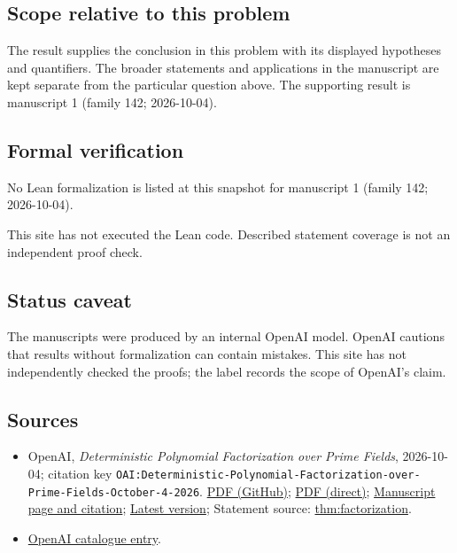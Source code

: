 \documentclass[11pt]{article}
\begin{document}
\subsection{Scope relative to this problem}
The result supplies the conclusion in this problem with its displayed hypotheses and quantifiers. The broader statements and applications in the manuscript are kept separate from the particular question above. The supporting result is manuscript 1 (family 142; 2026-10-04).

\subsection{Formal verification}
No Lean formalization is listed at this snapshot for manuscript 1 (family 142; 2026-10-04).

This site has not executed the Lean code. Described statement coverage is not an independent proof check.

\subsection{Status caveat}
The manuscripts were produced by an internal OpenAI model. OpenAI cautions that results without formalization can contain mistakes. This site has not independently checked the proofs; the label records the scope of OpenAI's claim.

\subsection{Sources}
\begin{itemize}
\item OpenAI, \emph{Deterministic Polynomial Factorization over Prime Fields}, 2026-10-04; citation key \texttt{OAI:Deterministic-Polynomial-Factorization-over-Prime-Fields-October-4-2026}. \href{https://github.com/openai/math/blob/adc7f1241b42e322a6451854ab7e4b4c146bf78a/preprints/Deterministic-Polynomial-Factorization-over-Prime-Fields-October-4-2026/Deterministic-Polynomial-Factorization-over-Prime-Fields.pdf}{PDF (GitHub)}; \href{https://github.com/openai/math/raw/adc7f1241b42e322a6451854ab7e4b4c146bf78a/preprints/Deterministic-Polynomial-Factorization-over-Prime-Fields-October-4-2026/Deterministic-Polynomial-Factorization-over-Prime-Fields.pdf}{PDF (direct)}; \href{https://github.com/openai/math/blob/adc7f1241b42e322a6451854ab7e4b4c146bf78a/preprints/Deterministic-Polynomial-Factorization-over-Prime-Fields-October-4-2026/README.md}{Manuscript page and citation}; \href{https://github.com/openai/math/blob/main/preprints/Deterministic-Polynomial-Factorization-over-Prime-Fields-October-4-2026/Deterministic-Polynomial-Factorization-over-Prime-Fields.pdf}{Latest version}; Statement source: \href{https://github.com/openai/math/blob/adc7f1241b42e322a6451854ab7e4b4c146bf78a/preprints/Deterministic-Polynomial-Factorization-over-Prime-Fields-October-4-2026/build/sections/00-introduction.tex\#L27}{thm:factorization}.
\item \href{https://github.com/openai/math/blob/adc7f1241b42e322a6451854ab7e4b4c146bf78a/CONTENTS.md}{OpenAI catalogue entry}.
\end{itemize}
\end{document}
